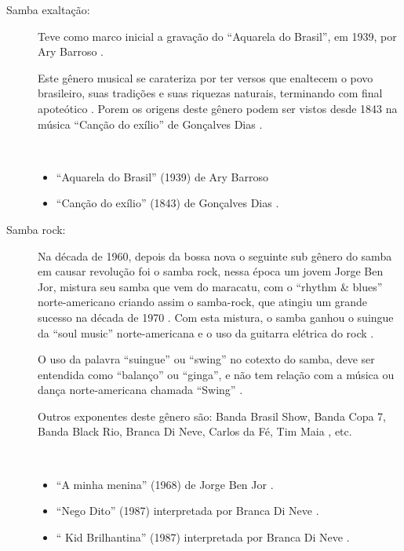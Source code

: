 \begin{description}
\item[Samba exaltação:] 
Teve como marco inicial a gravação do ``Aquarela do Brasil'', em 1939, 
por Ary Barroso \cite[pp. 73]{diniz2006almanaque} \cite[pp. 128]{perna2002samba}.

Este gênero musical se carateriza por ter versos que enaltecem o povo brasileiro, 
suas tradições e suas riquezas naturais, terminando com final apoteótico  \cite[pp. 73]{diniz2006almanaque}.
Porem os origens deste gênero podem ser vistos desde 1843 na música ``Canção do exílio'' de Gonçalves Dias \cite[pp. 128]{perna2002samba}.
\begin{example} ~

\begin{itemize}
\item ``Aquarela do Brasil'' (1939) de Ary Barroso  \cite[pp. 73]{diniz2006almanaque} \cite[pp. 128]{perna2002samba}
\item ``Canção do exílio'' (1843) de Gonçalves Dias \cite[pp. 128]{perna2002samba}.
\end{itemize}
\end{example}

\item[Samba rock:] 
Na década de 1960, depois da bossa nova o seguinte sub gênero do samba em causar revolução foi o samba rock,
nessa época um jovem Jorge Ben Jor, mistura seu samba que vem do maracatu,
com o ``rhythm \& blues'' norte-americano criando assim o samba-rock, 
que atingiu um grande sucesso na década de 1970 \cite{petillo2012curtindo}.
Com esta mistura, o samba ganhou o suingue da ``soul music'' norte-americana e o uso da guitarra elétrica do rock \cite[pp. 55]{arana2004brazilian} \cite{petillo2012curtindo}.

O uso da palavra ``suingue'' ou ``swing'' no cotexto do samba, 
deve ser entendida como ``balanço'' ou ``ginga'', 
e não tem relação com a música ou dança norte-americana chamada ``Swing'' \cite[pp. 131]{perna2002samba}. 

Outros exponentes deste gênero são: 
Banda Brasil Show, 
Banda Copa 7,
Banda Black Rio,
Branca Di Neve,
Carlos da Fé,
Tim Maia \cite[pp. 131]{perna2002samba}, etc.
\begin{example} ~

\begin{itemize}
\item ``A minha menina'' (1968) de Jorge Ben Jor \cite[pp. 232]{diniz2006almanaque}.
\item ``Nego Dito'' (1987) interpretada por Branca Di Neve \cite{BrancaDiNeve1987}.
\item `` Kid Brilhantina'' (1987)  interpretada por Branca Di Neve \cite{BrancaDiNeve1987}.
\end{itemize}
\end{example}


\end{description}
